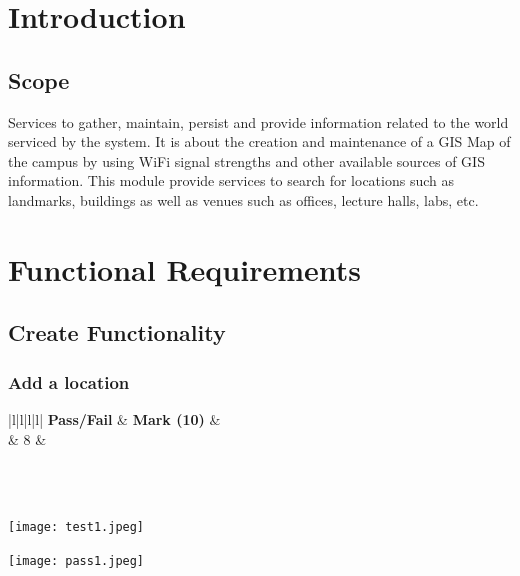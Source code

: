 \documentclass[runningheads,a4paper]{article}
\newcommand{\cmark}{\ding{51}}%
\begin{document}
\begingroup

\tableofcontents
{}
\endgroup
\newpage

\section{Introduction}

\subsection{Scope}
Services to gather, maintain, persist and provide information related to the world
serviced by the system. It is about the creation and maintenance of a GIS Map of the
campus by using WiFi signal strengths and other available sources of GIS
information.
This module provide services to search for locations such as landmarks, buildings as
well as venues such as offices, lecture halls, labs, etc.
 
\section{Functional Requirements}
\subsection{Create Functionality}
\subsubsection{Add a location}

\label{my-label}
\begin{tabular}{|l|l|l|l|}
	\hline
	\textbf{Pass/Fail} & \textbf{Mark (10)} &                                                                                                                                                               \\ 
	\hline
	\cmark  &   8  &  \\ \hline
\end{tabular} \\ \\
\begin{center}
	\begin{minipage}{0.48\linewidth}
		\texttt{[image: test1.jpeg]}
	\end{minipage}
	\hfill
	\begin{minipage}{0.49\linewidth}
		\texttt{[image: pass1.jpeg]}
	\end{minipage}
\end{center}
\pagebreak
\end{document}
